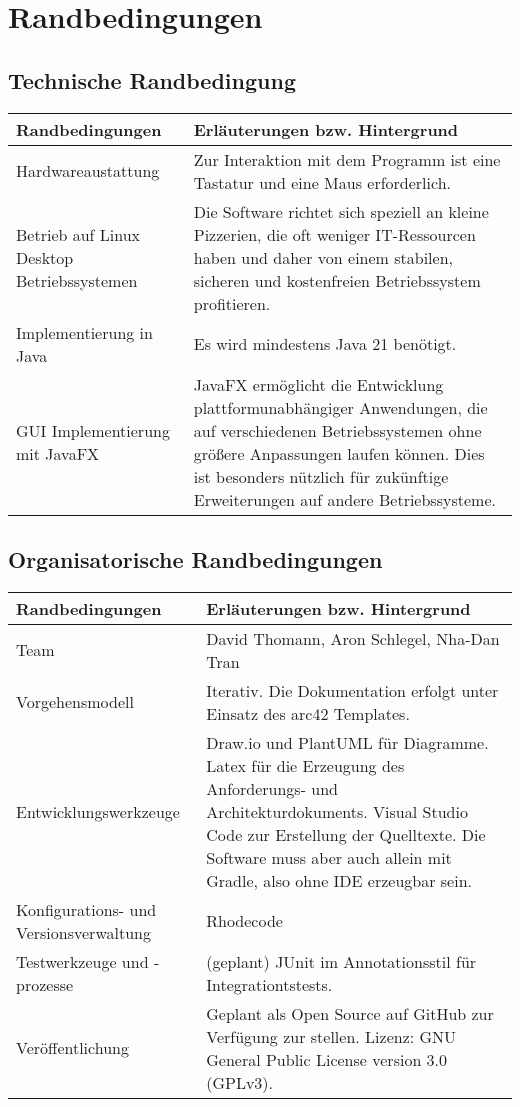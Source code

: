 \section{Randbedingungen}
\subsection{Technische Randbedingung}

\begin{longtable}{|m{}|m{}|}
    \hline
    \textbf{Randbedingungen} & \textbf{Erläuterungen bzw. Hintergrund}\\
    \hline 
    Hardwareaustattung & Zur Interaktion mit dem Programm ist eine Tastatur und eine Maus erforderlich.\\
    \hline    
    Betrieb auf Linux Desktop Betriebssystemen & Die Software richtet sich speziell an kleine Pizzerien, die oft weniger IT-Ressourcen haben und daher von einem stabilen, sicheren und kostenfreien Betriebssystem profitieren.\\
    \hline
    Implementierung in Java & Es wird mindestens Java 21 benötigt.\\
    \hline
    GUI Implementierung mit JavaFX & JavaFX ermöglicht die Entwicklung plattformunabhängiger Anwendungen, die auf verschiedenen Betriebssystemen ohne größere Anpassungen laufen können. Dies ist besonders nützlich für zukünftige Erweiterungen auf andere Betriebssysteme.\\
    \hline
\end{longtable}

\subsection{Organisatorische Randbedingungen}
\begin{longtable}{|m{}|m{}|}
    \hline
    \textbf{Randbedingungen} & \textbf{Erläuterungen bzw. Hintergrund}\\
    \hline 
    Team & David Thomann, Aron Schlegel, Nha-Dan Tran\\
    \hline
    Vorgehensmodell & Iterativ. Die Dokumentation erfolgt unter Einsatz des arc42 Templates.\\
    \hline
    Entwicklungswerkzeuge & Draw.io und PlantUML für Diagramme. Latex für die Erzeugung des Anforderungs- und Architekturdokuments. Visual Studio Code zur Erstellung der Quelltexte. Die Software muss aber auch allein mit Gradle, also ohne IDE erzeugbar sein.\\
    \hline
    Konfigurations- und Versionsverwaltung & Rhodecode\\
    \hline
    Testwerkzeuge und -prozesse & (geplant) JUnit im Annotationsstil für Integrationtstests.\\
    \hline
    Veröffentlichung & Geplant als Open Source auf GitHub zur Verfügung zur stellen. Lizenz: GNU General Public License version 3.0 (GPLv3). \\
    \hline
\end{longtable}